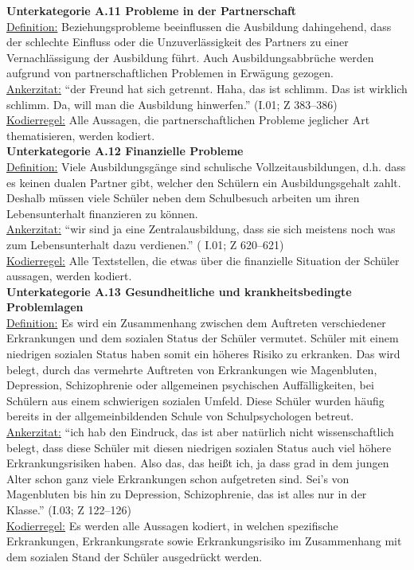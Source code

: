 \textbf{Unterkategorie A.11 Probleme in der Partnerschaft}\\
\underline{Definition:} Beziehungsprobleme beeinflussen die Ausbildung dahingehend, dass der schlechte Einfluss oder die Unzuverlässigkeit des Partners zu einer Vernachlässigung der Ausbildung führt. Auch Ausbildungsabbrüche werden aufgrund von partnerschaftlichen Problemen in Erwägung gezogen.\\
\underline{Ankerzitat:} "`der Freund hat sich getrennt. Haha, das ist schlimm. Das ist wirklich schlimm. Da, will man die Ausbildung hinwerfen."' (I.01; Z 383--386)\\
\underline{Kodierregel:} Alle Aussagen, die partnerschaftlichen Probleme jeglicher Art thematisieren, werden kodiert.\\

\textbf{Unterkategorie A.12 Finanzielle Probleme}\\
\underline{Definition:} Viele Ausbildungsgänge sind schulische Vollzeitausbildungen, d.h. dass es keinen dualen Partner gibt, welcher den Schülern ein Ausbildungsgehalt zahlt. Deshalb müssen viele Schüler neben dem Schulbesuch arbeiten um ihren Lebensunterhalt finanzieren zu können.\\
\underline{Ankerzitat:} "`wir sind ja eine Zentralausbildung, dass sie sich meistens noch was zum Lebensunterhalt dazu verdienen."' ( I.01; Z 620--621)\\
\underline{Kodierregel:} Alle Textstellen, die etwas über die finanzielle Situation der Schüler aussagen, werden kodiert.\\

\textbf{Unterkategorie A.13 Gesundheitliche und krankheitsbedingte Problemlagen}\\
\underline{Definition:} Es wird ein Zusammenhang zwischen dem Auftreten verschiedener Erkrankungen und dem sozialen Status der Schüler vermutet. Schüler mit einem niedrigen sozialen Status haben somit ein höheres Risiko zu erkranken. Das wird belegt, durch das vermehrte Auftreten von Erkrankungen wie Magenbluten, Depression, Schizophrenie oder allgemeinen psychischen Auffälligkeiten, bei Schülern aus einem schwierigen sozialen Umfeld. Diese Schüler wurden häufig bereits in der allgemeinbildenden Schule von Schulpsychologen betreut.\\
\underline{Ankerzitat:} "`ich hab den Eindruck, das ist aber natürlich nicht wissenschaftlich belegt, dass diese Schüler mit diesen niedrigen sozialen Status auch viel höhere Erkrankungsrisiken haben. Also das, das heißt ich, ja dass grad in dem jungen Alter schon ganz viele Erkrankungen schon aufgetreten sind. Sei's von Magenbluten bis hin zu Depression, Schizophrenie, das ist alles nur in der Klasse."' (I.03; Z 122--126)\\
\underline{Kodierregel:} Es werden alle Aussagen kodiert, in welchen spezifische Erkrankungen, Erkrankungsrate sowie Erkrankungsrisiko im Zusammenhang mit dem sozialen Stand der Schüler ausgedrückt werden.\\

